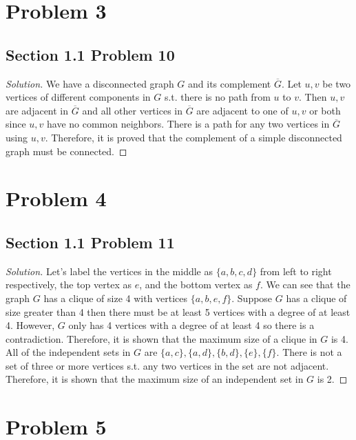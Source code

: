 \documentclass[12pt]{article}
\newenvironment{solution}{\begin{proof}[Solution]}{\end{proof}}
\begin{document}
\section*{Problem 3}
\subsection*{Section 1.1 Problem 10}
\begin{solution}
    We have a disconnected graph \(G\) and its complement \(\overline{G}\). Let
    \(u, v\) be two vertices of different components in \(G\) s.t. there is no
    path from \(u\) to \(v\). Then \(u, v\) are adjacent in \(\overline{G}\) and
    all other vertices in \(\overline{G}\) are adjacent to one of \(u, v\) or
    both since \(u, v\) have no common neighbors. There is a path for any two
    vertices in \(\overline{G}\) using \(u,v\). Therefore, it is proved that the
    complement of a simple disconnected graph must be connected.
\end{solution}

\section*{Problem 4}
\subsection*{Section 1.1 Problem 11}
\begin{solution}
    Let's label the vertices in the middle as \(\{a,b,c,d\}\) from left to right respectively,
    the top vertex as \(e\), and the bottom vertex as \(f\). We can see that the
    graph \(G\) has a clique of size 4 with vertices \(\{a,b,e,f\}\). Suppose
    \(G\) has a clique of size greater than 4 then there must be at least 5 vertices
    with a degree of at least 4. However, \(G\) only has 4 vertices with a degree
    of at least 4 so there is a contradiction. Therefore, it is shown that the
    maximum size of a clique in \(G\) is 4. All of the independent sets in \(G\)
    are \(\{a,c\},\{a,d\},\{b,d\},\{e\},\{f\}\). There is not a set of three or more
    vertices s.t. any two vertices in the set are not adjacent. Therefore, it
    is shown that the maximum size of an independent set in \(G\) is 2.
\end{solution}

\section*{Problem 5}
\end{document}
